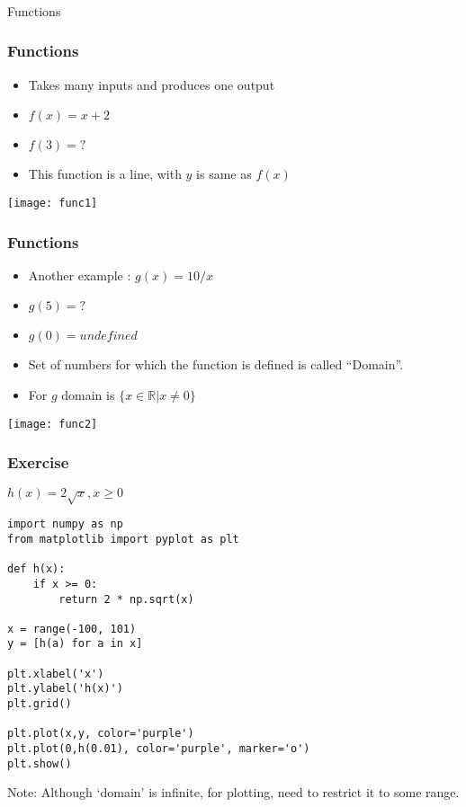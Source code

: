 \begin{frame}[fragile]\frametitle{}
\begin{center}
{\Large Functions}
\end{center}
\end{frame}

 \begin{frame}[fragile]\frametitle{Functions}
\begin{itemize}
\item Takes many inputs and produces one output
\item $f(x) = x + 2$
\item $f(3)=?$
\item This function is a line, with $y$ is same as $f(x)$
\end{itemize}
\begin{center}
\texttt{[image: func1]}
\end{center}
\end{frame}

 \begin{frame}[fragile]\frametitle{Functions}
\begin{itemize}
\item Another example : $g(x) = 10/x$
\item $g(5)=?$
\item $g(0)=undefined$
\item Set of numbers for which the function is defined is called ``Domain''.
\item For $g$ domain is $\{x \in \mathbb{R} | x \neq 0\}$
\end{itemize}
\begin{center}
\texttt{[image: func2]}
\end{center}
\end{frame}

 \begin{frame}[fragile]\frametitle{Exercise}
$h(x) = 2 \sqrt{x}, x \geq 0$

\begin{lstlisting}
import numpy as np
from matplotlib import pyplot as plt

def h(x):
    if x >= 0:
        return 2 * np.sqrt(x)

x = range(-100, 101)
y = [h(a) for a in x]

plt.xlabel('x')
plt.ylabel('h(x)')
plt.grid()

plt.plot(x,y, color='purple')
plt.plot(0,h(0.01), color='purple', marker='o')
plt.show()
\end{lstlisting}
Note: Although `domain' is infinite, for plotting, need to restrict it to some range.
\end{frame}

